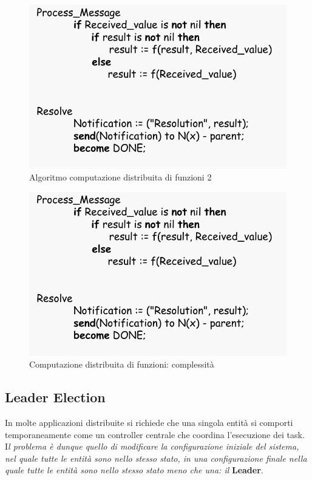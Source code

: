 \documentclass[12pt]{article}
\begin{document}
			\begin{figure}[h!]
				\centering
				\includegraphics[scale=0.3]{img/distfun1.png}
				\caption{Algoritmo computazione distribuita di funzioni 2}
			\end{figure}
			\begin{figure}[h!]
				\centering
				\includegraphics[scale=0.3]{img/distfun1.png}
				\caption{Computazione distribuita di funzioni: complessità}
			\end{figure}
		
	\subsection{Leader Election}
		In molte applicazioni distribuite si richiede che una singola entità  si comporti temporaneamente come un controller centrale che coordina l'esecuzione dei task. I\textit{l problema è dunque quello di modificare la configurazione iniziale del sistema, nel quale tutte le entità sono nello stesso stato, in una configurazione finale nella quale tutte le entità sono nello stesso stato meno che una: il} \textbf{Leader}. 
\end{document}
